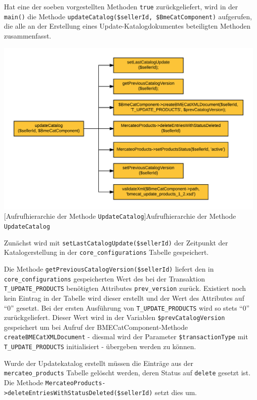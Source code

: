 	Hat eine der soeben vorgestellten Methoden \texttt{true} zurückgeliefert, wird in der \texttt{main()} die Methode \texttt{updateCatalog(\$sellerId, \$BmeCatComponent)} aufgerufen, die alle an der Erstellung eines Update-Katalogdokumentes beteiligten Methoden zusammenfasst.
	
	\begin{minipage}{\linewidth}
		\vspace{1em}
		\centering
		\includegraphics[width=0.7 \linewidth]{img/updateKatalogAufrufhierarchie}
		[Aufrufhierarchie der Methode \texttt{UpdateCatalog}]{Aufrufhierarchie der Methode \texttt{UpdateCatalog}}
		\vspace{1em}
	\end{minipage}
	
	Zunächst wird mit \texttt{setLastCatalogUpdate(\$sellerId)} der Zeitpunkt der Katalogerstellung in der \texttt{core\_configurations} Tabelle gespeichert.  
	
	Die Methode \texttt{getPreviousCatalogVersion(\$sellerId)} liefert den in \texttt{core\_configurations} gespeicherten Wert des bei der Transaktion \texttt{T\_UPDATE\_PRODUCTS} benötigten Attributes \texttt{prev\_version} zurück. Existiert noch kein Eintrag in der Tabelle wird dieser erstellt und der Wert des Attributes auf \enquote{0} gesetzt. Bei der ersten Ausführung von \texttt{T\_UPDATE\_PRODUCTS} wird so stets \enquote{0} zurückgeliefert. Dieser Wert wird in der Variablen \texttt{\$prevCatalogVersion} gespeichert um bei Aufruf der BMECatComponent-Methode \texttt{createBMECatXMLDocument} - diesmal wird der Parameter \texttt{\$transactionType} mit \texttt{T\_UPDATE\_PRODUCTS} initialisiert - übergeben werden zu können.
	
	Wurde der Updatekatalog erstellt müssen die Einträge aus der \texttt{mercateo\_products} Tabelle gelöscht werden, deren Status auf \texttt{delete} gesetzt ist. Die Methode \texttt{MercateoProducts->deleteEntries\-WithStatusDeleted(\$sellerId)} setzt dies um.
	

